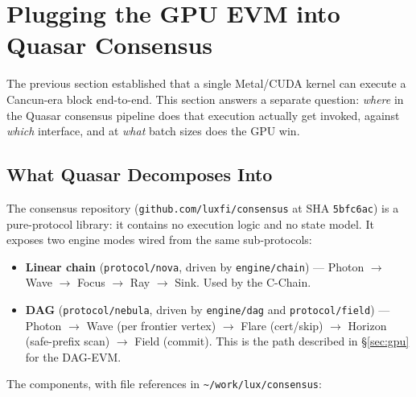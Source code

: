 \section{Plugging the GPU EVM into Quasar Consensus}

\label{sec:cevm-consensus-integration}

The previous section established that a single Metal/CUDA kernel can execute
a Cancun-era block end-to-end. This section answers a separate question:
\emph{where} in the Quasar consensus pipeline does that execution actually
get invoked, against \emph{which} interface, and at \emph{what} batch sizes
does the GPU win.

\subsection{What Quasar Decomposes Into}
\label{sec:cevm-quasar-recap}

The consensus repository (\texttt{github.com/luxfi/consensus} at SHA
\texttt{5bfc6ac}) is a pure-protocol library: it contains no execution
logic and no state model. It exposes two engine modes wired from the same
sub-protocols:

\begin{itemize}
  \item \textbf{Linear chain} (\texttt{protocol/nova}, driven by
    \texttt{engine/chain}) --- Photon $\to$ Wave $\to$ Focus $\to$ Ray $\to$
    Sink. Used by the C-Chain.
  \item \textbf{DAG} (\texttt{protocol/nebula}, driven by \texttt{engine/dag}
    and \texttt{protocol/field}) --- Photon $\to$ Wave (per frontier vertex)
    $\to$ Flare (cert/skip) $\to$ Horizon (safe-prefix scan) $\to$ Field
    (commit). This is the path described in \S\ref{sec:gpu} for the
    DAG-EVM.
\end{itemize}

The components, with file references in
\texttt{\textasciitilde/work/lux/consensus}:

